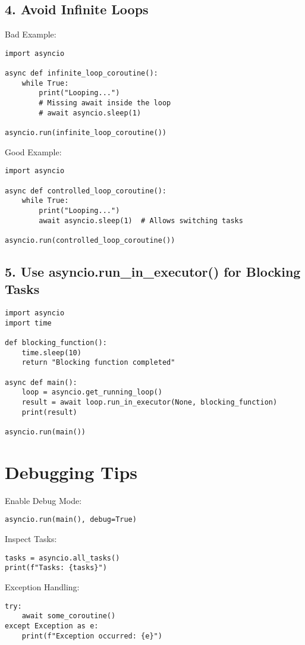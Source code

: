 \begin{tcolorbox}[
colback=pinkcolor!10!white,
colframe=pinkcolor!100!red,
left=2mm,
right=2mm,
title=\small\centering\textcolor{black}{Complete Guide to await asyncio.sleep() Issues},
breakable=true
]
\subsection*{4. Avoid Infinite Loops}
Bad Example:
\begin{verbatim}
import asyncio

async def infinite_loop_coroutine():
    while True:
        print("Looping...")
        # Missing await inside the loop
        # await asyncio.sleep(1)

asyncio.run(infinite_loop_coroutine())
\end{verbatim}

Good Example:
\begin{verbatim}
import asyncio

async def controlled_loop_coroutine():
    while True:
        print("Looping...")
        await asyncio.sleep(1)  # Allows switching tasks

asyncio.run(controlled_loop_coroutine())
\end{verbatim}

\subsection*{5. Use asyncio.run\_in\_executor() for Blocking Tasks}
\begin{verbatim}
import asyncio
import time

def blocking_function():
    time.sleep(10)
    return "Blocking function completed"

async def main():
    loop = asyncio.get_running_loop()
    result = await loop.run_in_executor(None, blocking_function)
    print(result)

asyncio.run(main())
\end{verbatim}

\section*{Debugging Tips}

Enable Debug Mode:
\begin{verbatim}
asyncio.run(main(), debug=True)
\end{verbatim}

Inspect Tasks:
\begin{verbatim}
tasks = asyncio.all_tasks()
print(f"Tasks: {tasks}")
\end{verbatim}

Exception Handling:
\begin{verbatim}
try:
    await some_coroutine()
except Exception as e:
    print(f"Exception occurred: {e}")
\end{verbatim}


\end{tcolorbox}
